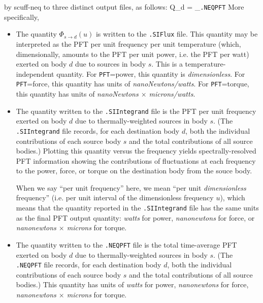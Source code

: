 \documentclass[letterpaper]{article}
\newcommand{\wh}{\widehat}
\begin{document}
by {\sc scuff-neq} to three distinct output files, as follows:
{
 \qquad \big\langle Q_d\big\rangle
 = 
   \underbrace{
   \Bigg[
   \int_0^\infty 
  \underbrace{\bigg\{ \hbar\omega_0^2 \sum_s \, \wh \Theta_s(u)
  \underbrace{\Phi\supt{PFT}_{s\to d}(u)}_{\texttt{.SIFlux}}
             \bigg\} }_{\texttt{.SIIntegrand}}
   \,\,du \Bigg]
              }_{\texttt{.NEQPFT}}
}
More specifically, 
\begin{itemize}
  \item The quantity $\Phi_{s\to d}(u)$ is written to the
        \texttt{.SIFlux} file. This quantity may be interpreted
        as the PFT per unit frequency per unit temperature 
        (which, dimensionally, amounts to the PFT per unit 
         power, i.e. the PFT per watt) exerted on body $d$ 
        due to sources
        in body $s.$ This is a temperature-independent quantity.
        For \texttt{PFT}=power, this quantity
        is \textit{dimensionless}. For \texttt{PFT}=force,
        this quantity has units of \textit{nanoNewtons/watts}.
        For \texttt{PFT}=torque, this quantity has units of 
        \textit{nanoNewtons $\times$ microns/watts}.

  \item The quantity written to the \texttt{.SIIntegrand} file
        is the PFT per unit frequency exerted on body $d$ due
        to thermally-weighted sources in body $s$.
        (The \texttt{.SIIntegrand} file records, for each 
         destination body $d$, both the individual contributions
         of each source body $s$ and the total contributions
         of all source bodies.) Plotting this quantity
         versus the frequency yields spectrally-resolved
         PFT information showing the contributions of fluctuations
         at each frequency to the power, force, or torque on 
         the destination body from the souce body.

         When we say ``per unit frequency'' here, we mean 
         ``per unit \textit{dimensionless} frequency'' 
         (i.e. per unit interval of the dimensionless 
          frequency $u$), which means that the quantity 
         reported in the \texttt{.SIIntegrand} file has the 
         same units as the final PFT output quantity:
         \textit{watts} for power,
         \textit{nanonewtons} for force, or 
         \textit{nanonewtons $\times$ microns} for torque.

  \item The quantity written to the \texttt{.NEQPFT} file
        is the total time-average PFT exerted on body $d$ due to 
        thermally-weighted sources in body $s$.
        (The \texttt{.NEQPFT} file records, for each
         destination body $d$, both the individual contributions
         of each source body $s$ and the total contributions
         of all source bodies.)
         This quantity has units of 
         \textit{watts} for power,
         \textit{nanonewtons} for force,
         \textit{nanonewtons $\times$ microns} for torque.
\end{itemize}
\end{document}
